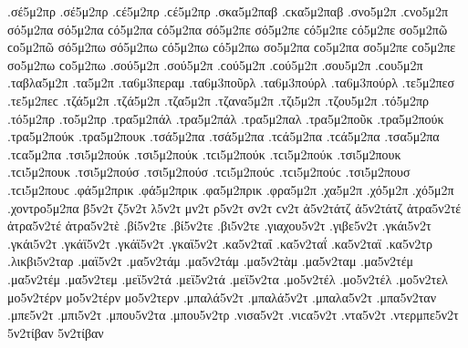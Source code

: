{.σέ5μ2πρ .σέ5μ2πρ .ϲέ5μ2πρ .ϲέ5μ2πρ   %
.σκα5μ2παβ .ϲκα5μ2παβ   %
.σνο5μ2π .ϲνο5μ2π   %
σό5μ2πα σό5μ2πα ϲό5μ2πα ϲό5μ2πα   %
σό5μ2πε σό5μ2πε ϲό5μ2πε ϲό5μ2πε 
σο5μ2πῶ ϲο5μ2πῶ 
σό5μ2πω σό5μ2πω ϲό5μ2πω ϲό5μ2πω 
σο5μ2πα ϲο5μ2πα 
σο5μ2πε ϲο5μ2πε 
σο5μ2πω ϲο5μ2πω 
.σού5μ2π .σού5μ2π .ϲού5μ2π .ϲού5μ2π   %
.σου5μ2π .ϲου5μ2π 
.ταβλα5μ2π   %
.τα5μ2π   %
.τα6μ3περαμ   %
.τα6μ3ποῦρλ   %
.τα6μ3πούρλ .τα6μ3πούρλ 
.τε5μ2πεσ .τε5μ2πεϲ   %
.τζά5μ2π .τζά5μ2π   %
.τζα5μ2π 
.τζανα5μ2π   %
.τζι5μ2π   %
.τζου5μ2π   %
.τό5μ2πρ .τό5μ2πρ   %
.το5μ2πρ 
.τρα5μ2πάλ .τρα5μ2πάλ   %
.τρα5μ2παλ 
.τρα5μ2ποῦκ   %
.τρα5μ2πούκ .τρα5μ2πούκ 
.τρα5μ2πουκ 
.τσά5μ2πα .τσά5μ2πα .τϲά5μ2πα .τϲά5μ2πα   %
.τσα5μ2πα .τϲα5μ2πα 
.τσι5μ2πούκ .τσι5μ2πούκ .τϲι5μ2πούκ .τϲι5μ2πούκ   %
.τσι5μ2πουκ .τϲι5μ2πουκ 
.τσι5μ2πούσ .τσι5μ2πούσ .τϲι5μ2πούϲ .τϲι5μ2πούϲ   %
.τσι5μ2πουσ .τϲι5μ2πουϲ 
.φά5μ2πρικ .φά5μ2πρικ   %
.φα5μ2πρικ 
.φρα5μ2π   %
.χα5μ2π   %
.χό5μ2π .χό5μ2π   %
.χοντρο5μ2πα   %
β5ν2τ 
ζ5ν2τ 
λ5ν2τ 
μν2τ 
ρ5ν2τ 
σν2τ ϲν2τ 
ἀ5ν2τάτζ ἀ5ν2τάτζ   %
ἀτρα5ν2τέ ἀτρα5ν2τέ   %
ἀτρα5ν2τὲ 
.βί5ν2τε .βί5ν2τε   %
.βι5ν2τε 
.γιαχου5ν2τ   %
.γιβε5ν2τ   %
.γκάι5ν2τ .γκάι5ν2τ   %
.γκάϊ5ν2τ .γκάϊ5ν2τ 
.γκαϊ5ν2τ 
.κα5ν2ταΐ .κα5ν2ταΐ   %
.κα5ν2ταϊ 
.κα5ν2τρ   %
.λικβι5ν2ταρ   %
.μαϊ5ν2τ   %
.μα5ν2τάμ .μα5ν2τάμ   %
.μα5ν2τὰμ 
.μα5ν2ταμ 
.μα5ν2τέμ .μα5ν2τέμ   %
.μα5ν2τεμ 
.μεϊ5ν2τά .μεϊ5ν2τά   %
.μεϊ5ν2τα 
.μο5ν2τέλ .μο5ν2τέλ   %
.μο5ν2τελ 
μο5ν2τέρν μο5ν2τέρν   %
μο5ν2τερν 
.μπαλά5ν2τ .μπαλά5ν2τ   %
.μπαλα5ν2τ 
.μπα5ν2ταν   %
.μπε5ν2τ   %
.μπι5ν2τ   %
.μπου5ν2τα   %
.μπου5ν2τρ   %
.νισα5ν2τ .νιϲα5ν2τ   %
.ντα5ν2τ   %
.ντερμπε5ν2τ   %
5ν2τίβαν 5ν2τίβαν   %
}
